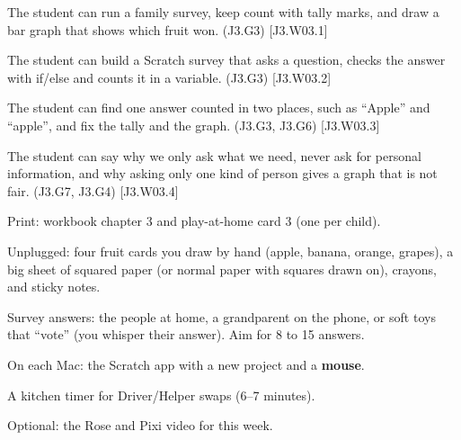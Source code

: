 
\begin{objectives}
  \item The student can run a family survey, keep count with tally marks, and draw a bar graph that shows which fruit won. (J3.G3) [J3.W03.1]
  \item The student can build a Scratch survey that asks a question, checks the answer with if/else and counts it in a variable. (J3.G3) [J3.W03.2]
  \item The student can find one answer counted in two places, such as \enquote{Apple} and \enquote{apple}, and fix the tally and the graph. (J3.G3, J3.G6) [J3.W03.3]
  \item The student can say why we only ask what we need, never ask for personal information, and why asking only one kind of person gives a graph that is not fair. (J3.G7, J3.G4) [J3.W03.4]
\end{objectives}

\begin{materials}
  \item Print: workbook chapter 3 and play-at-home card 3 (one per child).
  \item Unplugged: four fruit cards you draw by hand (apple, banana, orange, grapes), a big sheet of squared paper (or normal paper with squares drawn on), crayons, and sticky notes.
  \item Survey answers: the people at home, a grandparent on the phone, or soft toys that \enquote{vote} (you whisper their answer). Aim for 8 to 15 answers.
  \item On each Mac: the Scratch app with a new project and a \textbf{mouse}.
  \item A kitchen timer for Driver/Helper swaps (6--7 minutes).
  \item Optional: the Rose and Pixi video for this week.
\end{materials}

